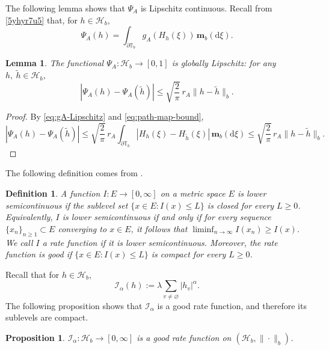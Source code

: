 \documentclass[a4paper, 11pt]{article}
\newcommand{\1}{\mathbf 1}
\theoremstyle{plain}
\newtheorem{proposition}[theorem]{Proposition}
\newtheorem{lemma}[theorem]{Lemma}
\newtheorem{definition}[theorem]{Definition}
\begin{document}
The following lemma shows that $\Psi_A$ is Lipschitz continuous. Recall from \eqref{5yhyr7u5} that, for \(h\in\mathcal{H}_b\),
\[
  \Psi_A(h)
  =
  \int_{\partial\mathbb{T}_b}g_A(H_h(\xi))\,\mathbf m_b(\mathrm{d}\xi).
\]


\begin{lemma}\label{lem:Psi-Lipschitz}
The functional \(\Psi_A:\mathcal{H}_b\to[0,1]\) is globally Lipschitz: for any $h,~\widetilde h\in\mathcal{H}_b$,
\begin{equation}\label{eq:Psi-Lipschitz}
  |\Psi_A(h)-\Psi_A(\widetilde h)|
  \leq
  \sqrt{\frac{2}{\pi}}\,r_A
  \|h-\widetilde h\|_b.
\end{equation}
\end{lemma}

\begin{proof}
By \eqref{eq:gA-Lipschitz} and \eqref{eq:path-map-bound},
\[
  |\Psi_A(h)-\Psi_A(\widetilde h)|
  \leq
  \sqrt{\frac{2}{\pi}}\,r_A
  \int_{\partial\mathbb{T}_b}|H_h(\xi)-H_{\widetilde h}(\xi)|
  \,\mathbf m_b(\mathrm{d}\xi)
  \leq
  \sqrt{\frac{2}{\pi}}\,r_A\|h-\widetilde h\|_b.
\]
\end{proof}
The following definition comes from \cite[p. 4]{DemboZeitouni2010}.
\begin{definition}\label{54thytr7gt5}
A function \(I:E\to[0,\infty]\) on a metric space \(E\) is {\em lower
semicontinuous} if the sublevel set \(\{x\in E:I(x)\leq L\}\) is closed for every $L\geq0$.
Equivalently, $I$ is lower semicontinuous if and only if for every sequence $\{x_n\}_{n\geq1}\subset E$ converging to $x\in E$, it follows that $\liminf_{n\to\infty}I(x_n)\geq I(x).$ We call $I$ a {\em rate function} if it is lower semicontinuous.
Moreover, the rate function is {\em good} if \(\{x\in E:I(x)\leq L\}\) is compact for every $L\geq0$.
\end{definition}
Recall that for $h\in\mathcal{H}_b$,
\[
\mathcal{I_{\alpha}}(h):=\lambda\sum_{v\neq\varnothing}|h_v|^\alpha.
\]
The following proposition shows that $\mathcal{I_{\alpha}}$ is a good rate function, and therefore its sublevels are compact.
\begin{proposition}
\label{prop:energy-good}
 \(\mathcal{I_{\alpha}}:\mathcal{H}_b\to[0,\infty]\) is a good rate function on \((\mathcal{H}_b,\|\cdot\|_b)\).
\end{proposition}
\end{document}
